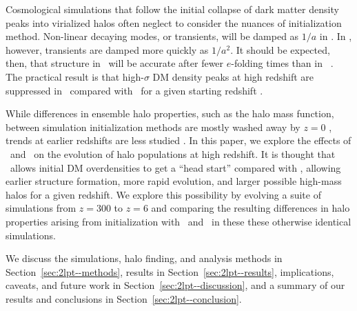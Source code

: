 

Cosmological simulations that follow the initial collapse of dark matter density peaks into virialized halos often neglect to consider the nuances of initialization method.  Non-linear decaying modes, or transients, will be damped as $1 / a$ in \za.  In \lpt, however, transients are damped more quickly as $1 / a^{2}$.  It should be expected, then, that structure in \lpt\ will be accurate after fewer $e$-folding times than in \za\ \citep{1998MNRAS.299.1097S, 2006MNRAS.373..369C, 2010MNRAS.403.1859J}.  The practical result is that high-$\sigma$ DM density peaks at high redshift are suppressed in \za\ compared with \lpt\ for a given starting redshift \citep{2006MNRAS.373..369C}.






While differences in ensemble halo properties, such as the halo mass function, between simulation initialization methods are mostly washed away by $z=0$ \citep{1998MNRAS.299.1097S}, trends at earlier redshifts are less studied \citep{2007ApJ...671.1160L}.  In this paper, we explore the effects of \za\ and \lpt\ on the evolution of halo populations at high redshift.  It is thought that \lpt\ allows initial DM overdensities to get a ``head start'' compared with \za, allowing earlier structure formation, more rapid evolution, and larger possible high-mass halos for a given redshift.  We explore this possibility by evolving a suite of simulations from $z = 300$ to $z = 6$ and comparing the resulting differences in halo properties arising from initialization with \za\ and \lpt\ in these these otherwise identical simulations.

We discuss the simulations, halo finding, and analysis methods in Section~\ref{sec:2lpt--methods}, results in Section~\ref{sec:2lpt--results}, implications, caveats, and future work in Section~\ref{sec:2lpt--discussion}, and a summary of our results and conclusions in Section~\ref{sec:2lpt--conclusion}.




